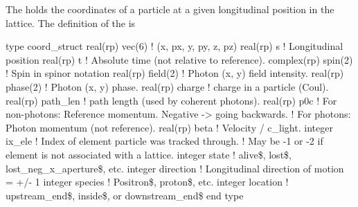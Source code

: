 The  holds the coordinates of a particle at a given
longitudinal position in the lattice. The definition of the
 is
\begin{example}
  type coord_struct
    real(rp) vec(6)     ! (x, px, y, py, z, pz)
    real(rp) s          ! Longitudinal position
    real(rp) t          ! Absolute time (not relative to reference).
    complex(rp) spin(2) ! Spin in spinor notation
    real(rp) field(2)   ! Photon (x, y) field intensity.
    real(rp) phase(2)   ! Photon (x, y) phase.
    real(rp) charge     ! charge in a particle (Coul).
    real(rp) path_len   ! path length (used by coherent photons).
    real(rp) p0c        ! For non-photons: Reference momentum. Negative -> going backwards.
                        !     For photons: Photon momentum (not reference).
    real(rp) beta       ! Velocity / c_light. 
    integer ix_ele      ! Index of element particle was tracked through.
                        !   May be -1 or -2 if element is not associated with a lattice.
    integer state       ! alive\$, lost\$, lost_neg_x_aperture\$, etc.
    integer direction   ! Longitudinal direction of motion = +/- 1
    integer species     ! Positron\$, proton\$, etc.
    integer location    ! upstream_end\$, inside\$, or downstream_end\$
end type
\end{example}

